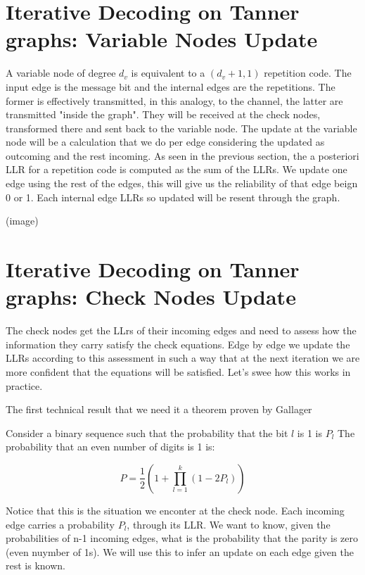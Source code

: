\section{Iterative Decoding on Tanner graphs: Variable Nodes Update}

A variable node of degree $d_v$ is equivalent to a $(d_v+1, 1)$ repetition code. The input edge is the message bit and the internal edges are the repetitions. The former is effectively transmitted, in this analogy, to the channel, the latter are transmitted "inside the graph". They will be received at the check nodes, transformed there and sent back to the variable node. The update at the variable node will be a calculation that we do per edge considering the updated as outcoming and the rest incoming. As seen in the previous section, the a posteriori LLR for a repetition code is computed as the sum of the LLRs. We update one edge using the rest of the edges, this will give us the reliability of that edge beign 0 or 1. Each internal edge LLRs so updated will be resent through the graph. 

(image)


\section{Iterative Decoding on Tanner graphs: Check Nodes Update}

The check nodes get the LLrs of their incoming edges and need to assess how the information they carry satisfy the check equations. Edge by edge we update the LLRs according to this assessment in such a way that at the next iteration we are more confident that the equations will be satisfied. Let's swee how this works in practice.

The first technical result that we need it a theorem proven by Gallager

\begin{theorem}
	
	Consider a binary sequence such that the probability that the bit $l$ is 1 is $P_l$
	The probability that an even number of digits is 1 is:

	\begin{equation}
		P = \frac{1}{2}\left(1 + \prod_{l=1}^{k}(1 - 2P_l)\right)
	\end{equation}
	
\end{theorem}


Notice that this is the situation we enconter at the check node. Each incoming edge carries a probability $P_l$, through its LLR. We want to know, given the probabilities of n-1 incoming edges, what is the probability that the parity is zero (even nuymber of 1s). We will use this to infer an update on each edge given the rest is known.

